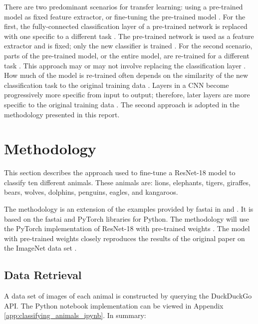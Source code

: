 There are two predominant scenarios for transfer learning: using a pre-trained model as fixed feature extractor, or fine-tuning the pre-trained model \cite{stanforduniversity_2023}. For the first, the fully-connected classification layer of a pre-trained network is replaced with one specific to a different task \cite{stanforduniversity_2023}. The pre-trained network is used as a feature extractor and is fixed; only the new classifier is trained \cite{stanforduniversity_2023}. For the second scenario, parts of the pre-trained model, or the entire model, are re-trained for a different task \cite{stanforduniversity_2023}. This approach may or may not involve replacing the classification layer \cite{stanforduniversity_2023}. How much of the model is re-trained often depends on the similarity of the new classification task to the original training data \cite{stanforduniversity_2023}. Layers in a CNN become progressively more specific from input to output; therefore, later layers are more specific to the original training data \cite{stanforduniversity_2023}. The second approach is adopted in the methodology presented in this report.

\section{Methodology}

This section describes the approach used to fine-tune a ResNet-18 model to classify ten different animals. These animals are: lions, elephants, tigers, giraffes, bears, wolves, dolphins, penguins, eagles, and kangaroos.

The methodology is an extension of the examples provided by fastai in \cite{howard_2022} and \cite{howard_2020}. It is based on the fastai and PyTorch libraries for Python. The methodology will use the PyTorch implementation of ResNet-18 with pre-trained weights \cite{torchcontributors_nd}. The model with pre-trained weights closely reproduces the results of the original paper \cite{he_2016} on the ImageNet data set \cite{torchcontributors_nd}.

\subsection{Data Retrieval}

A data set of images of each animal is constructed by querying the DuckDuckGo API. The Python notebook implementation can be viewed in Appendix \ref{app:classifying_animals_ipynb}. In summary:

